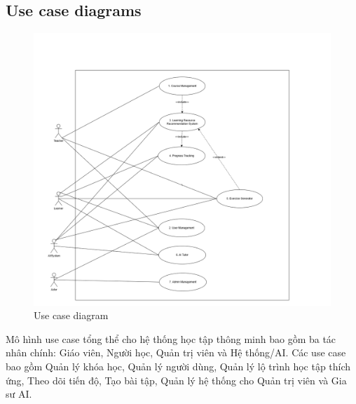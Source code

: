\subsection{Use case diagrams}
\begin{figure}[H]
    \centering
    \includegraphics[scale=0.3]{Images/Usecase/usecase-All.drawio.png}
    \caption{Use case diagram}
    \label{fig:enter-label}
\end{figure}
\quad Mô hình use case tổng thể cho hệ thống học tập thông minh bao gồm ba tác nhân chính: Giáo viên, Người học, Quản trị viên và Hệ thống/AI. Các use case bao gồm Quản lý khóa học, Quản lý người dùng, Quản lý lộ trình học tập thích ứng, Theo dõi tiến độ, Tạo bài tập, Quản lý hệ thống cho Quản trị viên và Gia sư AI.
